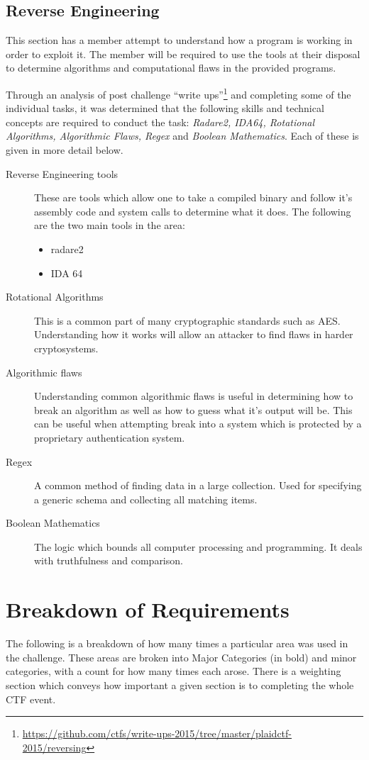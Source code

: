 \documentclass[twoside,a4paper,11pt]{report}
\begin{document}
		\subsection{Reverse Engineering}
			This section has a member attempt to understand how a program is working in order to exploit it. 
			The member will be required to use the tools at their disposal to determine algorithms and computational flaws in the provided programs. 

			Through an analysis of post challenge ``write ups''\footnote{\url{https://github.com/ctfs/write-ups-2015/tree/master/plaidctf-2015/reversing}}
			and completing some of the individual tasks, 
			it was determined that the following skills and technical concepts are required to conduct the task: 
			\textit{Radare2, IDA64, Rotational Algorithms, Algorithmic Flaws, Regex} and \textit{Boolean Mathematics}.
			Each of these is given in more detail below. 
			\begin{description}
				\item[Reverse Engineering tools] 
					These are tools which allow one to take a compiled binary and follow it's assembly code and system calls to determine what it does. 
					The following are the two main tools in the area:
					\begin{itemize}
						\item radare2
						\item IDA 64
					\end{itemize}
				\item[Rotational Algorithms]
					This is a common part of many cryptographic standards such as AES. 
					Understanding how it works will allow an attacker to find flaws in harder cryptosystems.
				\item[Algorithmic flaws] 
					Understanding common algorithmic flaws is useful in determining how to break an algorithm as well as how to guess what it's output will be. 
					This can be useful when attempting break into a system which is protected by a proprietary authentication system. 
				\item[Regex]
					A common method of finding data in a large collection. 
					Used for specifying a generic schema and collecting all matching items. 
				\item[Boolean Mathematics] 
					The logic which bounds all computer processing and programming. 
					It deals with truthfulness and comparison. 
			\end{description}
	
	\section{Breakdown of Requirements}
	 	The following is a breakdown of how many times a particular area was used in the challenge. 
		These areas are broken into Major Categories (in bold) and minor categories, with a count for how many times each arose. 
		There is a weighting section which conveys how important a given section is to completing the whole CTF event. 
\end{document}
